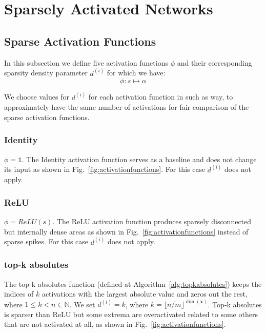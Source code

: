 \documentclass[journal]{IEEEtran}
\begin{document}
\section{Sparsely Activated Networks}\label{sec:sans}

\subsection{Sparse Activation Functions}\label{sec:safs}
In this subsection we define five activation functions $\phi$ and their corresponding sparsity density parameter $d^{(i)}$ for which we have:
\begin{equation}
	\label{eq:phi}
	\phi: s \longmapsto \alpha
\end{equation}

We choose values for $d^{(i)}$ for each activation function in such as way, to approximately have the same number of activations for fair comparison of the sparse activation functions.

\subsubsection{Identity}\label{sec:identity}
$\phi = \mathds{1}$.
The Identity activation function serves as a baseline and does not change its input as shown in Fig.~\ref{fig:activationfunctions}.
For this case $d^{(i)}$ does not apply.

\subsubsection{ReLU}\label{sec:relu}
$\phi = ReLU(s)$.
The ReLU activation function produces sparsely disconnected but internally dense areas as shown in Fig.~\ref{fig:activationfunctions} instead of sparse spikes.
For this case $d^{(i)}$ does not apply.

\subsubsection{top-k absolutes}\label{sec:topkabsolutes}
The top-k absolutes function (defined at Algorithm~\ref{alg:topkabsolutes}) keeps the indices of $k$ activations with the largest absolute value and zeros out the rest, where $1 \le k < n \in \mathbb{N}$.
We set $d^{(i)} = k$, where $k = \lfloor n/m \rfloor^{\dim(\bm{x})}$.
Top-k absolutes is sparser than ReLU but some extrema are overactivated related to some others that are not activated at all, as shown in Fig.~\ref{fig:activationfunctions}.
\end{document}
